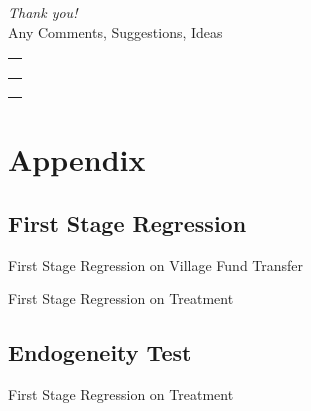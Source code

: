 \documentclass[
11pt,notheorems,compress,hyperref={pdfauthor=Maghfira Ramadhani}
]{beamer}
\begin{document}
\begin{frame}{}
  \centering
  {\LARGE\emph{Thank you!}}\\
  \vspace{1cm}
  Any Comments, Suggestions, Ideas\\
  \href{mailto:\maghfira.ramadhani@gatech.edu}{\faEnvelope\ \  }\\
  \href{http://maghfiraer.github.io}{\faHome\ \  } \\
  \href{https://github.com/maghfiraer/ECON7023-Metrics-II/tree/main/Final_Project}{\faGithubSquare\ \  }
\end{frame}

\appendix
\section{Appendix}
\subsection{First Stage Regression}
\begin{frame}
\label{FSVF}
    \begin{table}[h]
    \caption{First Stage Regression on Village Fund Transfer \hyperlink{VFclick}{}}
    \scalebox{0.6}{}    
    \end{table}
\end{frame}

\begin{frame}
\label{FSD}
    \begin{table}[h]
    \caption{First Stage Regression on Treatment \hyperlink{Dclick}{}}
    \scalebox{0.55}{}    
    \end{table}
    
\end{frame}

\subsection{Endogeneity Test}
\begin{frame}
\label{Endotest}
    \begin{table}[h]
    \caption{First Stage Regression on Treatment \hyperlink{Dclick}{}}
    \scalebox{0.55}{}    
    \end{table}
    
\end{frame}
\end{document}
